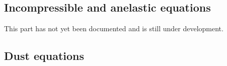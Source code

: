 \documentclass[\mydriver,12pt,twoside,notitlepage,a4paper]{article}
\begin{document}

\subsection{Incompressible and anelastic equations}

This part has not yet been documented and is still under development.


\subsection{Dust equations}
\end{document}
